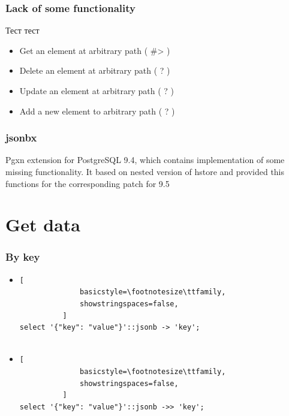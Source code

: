\documentclass[14pt, compress, aspectratio=169]{beamer}
\begin{document}
\begin{frame}[fragile]
  \frametitle{Lack of some functionality}
  Тест тест

  \begin{itemize}
      \item[\MVRightarrow] Get an element at arbitrary path ( \#> )
      \item[\MVRightarrow] Delete an element at arbitrary path  ( ? )
      \item[\MVRightarrow] Update an element at arbitrary path ( ? )
      \item[\MVRightarrow] Add a new element to arbitrary path ( ? )
  \end{itemize}

\end{frame}

\begin{frame}[fragile]
  \frametitle{jsonbx}

  Pgxn extension for PostgreSQL 9.4, which contains implementation of
  some missing functionality. It based on nested version of hstore
  and provided this functions for the corresponding patch for 9.5

\end{frame}

\section{Get data}

\begin{frame}[fragile]
  \frametitle{By key}

  \begin{itemize}
      \item
          \begin{lstlisting}[
              basicstyle=\footnotesize\ttfamily,
              showstringspaces=false,
          ]
select '{"key": "value"}'::jsonb -> 'key';
         
          \end{lstlisting}

      \item
          \begin{lstlisting}[
              basicstyle=\footnotesize\ttfamily,
              showstringspaces=false,
          ]
select '{"key": "value"}'::jsonb ->> 'key';
         
          \end{lstlisting}

  \end{itemize}

\end{frame}
\end{document}
